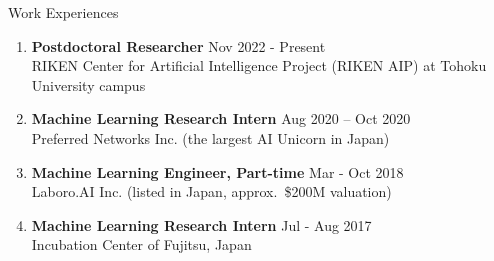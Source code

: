 \documentclass{resume} %
\begin{document}
\begin{rSection}{Work Experiences}
    \begin{enumerate}
        \item {\bf Postdoctoral Researcher} \hfill {Nov 2022 - Present}  \\
            RIKEN Center for Artificial Intelligence Project (RIKEN AIP) at Tohoku University campus

        \item {\bf Machine Learning Research Intern}  \hfill {Aug 2020 – Oct 2020} \\
        Preferred Networks Inc. (the largest AI Unicorn in Japan)
    
        \item {\bf Machine Learning Engineer, Part-time} \hfill {Mar - Oct 2018} \\
        Laboro.AI Inc. (listed in Japan, approx.\ \$200M valuation)
    
        \item {\bf Machine Learning Research Intern} \hfill {Jul - Aug 2017}  \\
        Incubation Center of Fujitsu, Japan
		
    \end{enumerate}
\end{rSection}
\end{document}
